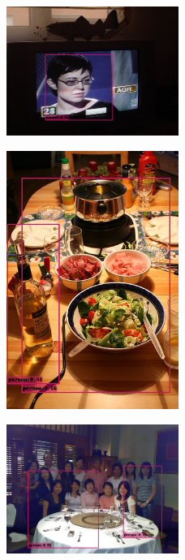 \begin{figure}[h!]
  \centering
  \includegraphics[width=0.5\textwidth]{figures/000342.png}
\end{figure}

\begin{figure}[h!]
  \centering
  \includegraphics[width=0.5\textwidth]{figures/008591.png}
\end{figure}

\begin{figure}[h!]
  \centering
  \includegraphics[width=0.5\textwidth]{figures/003123.png}
\end{figure}


